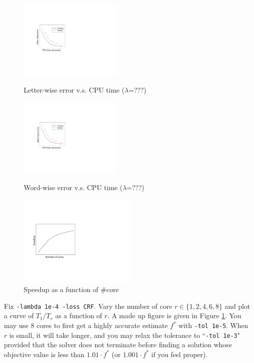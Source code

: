 \documentclass[11pt]{report}
\begin{document}
\begin{figure}[t]
	\centering
	\begin{minipage}[t]{0.49\textwidth}
		\centering
		\includegraphics[width=5cm]{curve_letter}
		\caption{Letter-wise error v.s. CPU time ($\lambda$=???)}
		\label{fig:letter_err}
	\end{minipage}
	\begin{minipage}[t]{0.49\textwidth}
		\centering
		\includegraphics[width=5cm]{curve_word}
		\caption{Word-wise error v.s. CPU time ($\lambda$=???)}
		\label{fig:word_err}
	\end{minipage}

%
\vspace{2em}
\centering
\includegraphics[width=5.8cm]{scalability}
\caption{Speedup as a function of \#core}
\label{fig:scalability}
\end{figure}

Fix \verb!-lambda 1e-4 -loss CRF!.
Vary the number of core $r \in \{1, 2, 4, 6, 8\}$ and plot a curve of $T_1 / T_r$ as a function of $r$.
A made up figure is given in Figure \ref{fig:scalability}.
You may use 8 cores to first get a highly accurate estimate $f^*$ with \verb!-tol 1e-5!.
When $r$ is small, it will take longer, and you may relax the tolerance to ``\verb!-tol 1e-3!" provided that the solver does not terminate before finding a solution whose objective value is less than $1.01 \cdot f^*$ (or $1.001 \cdot f^*$ if you feel proper).
\end{document}
